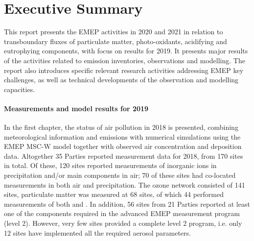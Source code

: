 \chapter*{Executive Summary}


This report presents the EMEP activities in 2020 and 2021 in relation to transboundary
fluxes of particulate matter, photo-oxidants, acidifying and
eutrophying components, with focus on results
for 2019. It presents major results of the activities related to
emission inventories, observations and modelling. The report also
introduces specific relevant research activities addressing EMEP key
challenges, as well as technical developments of the observation and
modelling capacities.

\subsubsection*{Measurements and model results for 2019} %
In the first chapter, the status of air pollution in 2018 is presented, combining 
meteorological information and emissions with numerical simulations using the EMEP MSC-W model together with observed air concentration and deposition data.
Altogether 35 Parties reported measurement data for 2018, from 170 sites in total. 
Of these, 120 sites reported measurements of inorganic ions in precipitation and/or 
main components in air; 70 of these sites had co-located measurements in both air and 
precipitation. The ozone network consisted of 141 sites, particulate matter was measured at 
68 sites, of which 44 performed measurements of both \PM[10] and \PM[2.5]. 
In addition, 56 sites from 21 Parties reported at least one of the components required in the advanced EMEP measurement program (level 2). However, very few sites provided a complete level 2 program, i.e. only 12 sites have implemented all the required aerosol parameters. 

